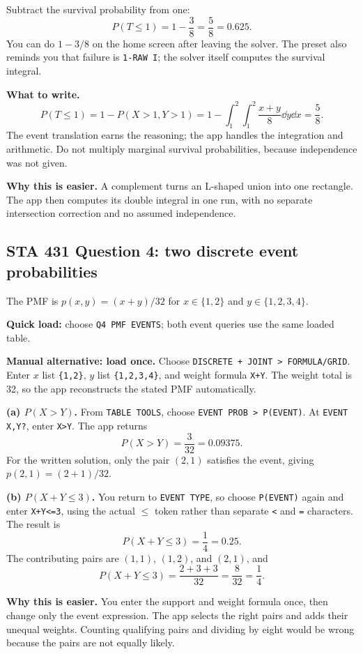 Subtract the survival probability from one:
\[
\boxed{P(T\le1)=1-\frac38=\frac58=0.625.}
\]
You can do $1-3/8$ on the home screen after leaving the solver. The preset also reminds you that failure is \texttt{1-RAW I}; the solver itself computes the survival integral.

\textbf{What to write.}
\[
P(T\le1)=1-P(X>1,Y>1)
=1-\int_1^2\int_1^2\frac{x+y}{8}\dd y\dd x
=\frac58.
\]
The event translation earns the reasoning; the app handles the integration and arithmetic. Do not multiply marginal survival probabilities, because independence was not given.

\textbf{Why this is easier.} A complement turns an L-shaped union into one rectangle. The app then computes its double integral in one run, with no separate intersection correction and no assumed independence.

\clearpage
\subsection{STA 431 Question 4: two discrete event probabilities}
The PMF is $p(x,y)=(x+y)/32$ for $x\in\{1,2\}$ and $y\in\{1,2,3,4\}$.

\textbf{Quick load:} choose \texttt{Q4 PMF EVENTS}; both event queries use the same loaded table.\par
\textbf{Manual alternative: load once.} Choose \texttt{DISCRETE + JOINT > FORMULA/GRID}. Enter $x$ list \texttt{\{1,2\}}, $y$ list \texttt{\{1,2,3,4\}}, and weight formula \texttt{X+Y}. The weight total is 32, so the app reconstructs the stated PMF automatically.

\textbf{(a) $P(X>Y)$.} From \texttt{TABLE TOOLS}, choose \texttt{EVENT PROB > P(EVENT)}. At \texttt{EVENT X,Y?}, enter \texttt{X>Y}. The app returns
\[
\boxed{P(X>Y)=\frac3{32}=0.09375.}
\]
For the written solution, only the pair $(2,1)$ satisfies the event, giving $p(2,1)=(2+1)/32$.

\textbf{(b) $P(X+Y\le3)$.} You return to \texttt{EVENT TYPE}, so choose \texttt{P(EVENT)} again and enter \texttt{X+Y<=3}, using the actual $\le$ token rather than separate \texttt{<} and \texttt{=} characters. The result is
\[
\boxed{P(X+Y\le3)=\frac14=0.25.}
\]
The contributing pairs are $(1,1)$, $(1,2)$, and $(2,1)$, and
\[
P(X+Y\le3)=\frac{2+3+3}{32}=\frac8{32}=\frac14.
\]

\textbf{Why this is easier.} You enter the support and weight formula once, then change only the event expression. The app selects the right pairs and adds their unequal weights. Counting qualifying pairs and dividing by eight would be wrong because the pairs are not equally likely.

